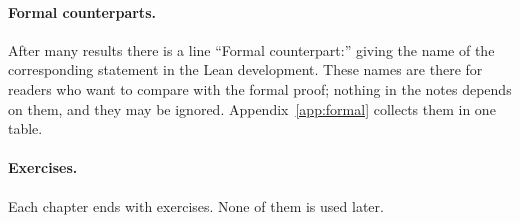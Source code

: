 \paragraph{Formal counterparts.} After many results there is a line ``Formal counterpart:''
giving the name of the corresponding statement in the Lean development. These names are
there for readers who want to compare with the formal proof; nothing in the notes depends
on them, and they may be ignored. Appendix~\ref{app:formal} collects them in one table.

\paragraph{Exercises.} Each chapter ends with exercises. None of them is used later.
